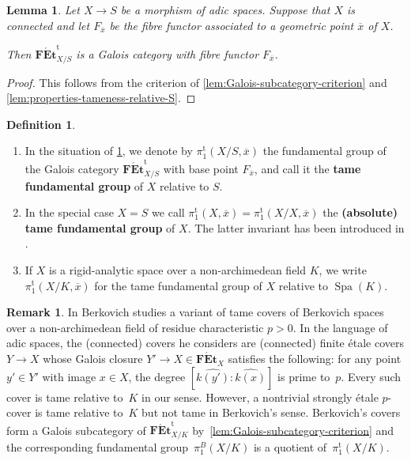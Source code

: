 \documentclass[a4paper,twoside,11pt,reqno]{amsart}
\DeclareMathOperator{\Spa}{Spa}
\newcommand{\cat}[1]{\mathbf{#1}}
\newcommand{\FEt}{\cat{F\acute{E}t}}
\newcommand{\ov}[1]{\overline{#1}}
\newcommand{\pitame}{\pi_1^{\mathrm{t}}}
\newcommand{\FEtt}{{\cat{F\acute{E}t}}^{\!\mathrm{t}}}
\newtheorem{lem}[thm]{Lemma}
\theoremstyle{definition}
\newtheorem{defi}[thm]{Definition}
\newtheorem{rmk}[thm]{Remark}
\numberwithin{equation}{subsection}
\begin{document}
\begin{lem} 
\label{lemma:adic-tame-galois}
    Let $X\to S$ be a morphism of adic spaces. Suppose that $X$ is connected and let $F_{\ov x}$ be the fibre functor associated to a geometric point  $\ov{x}$ of $X$. 

    Then $\FEtt_{X/S}$ is a Galois category with fibre functor $F_{\ov{x}}$. 
\end{lem}

\begin{proof}
This follows from the criterion of \cref{lem:Galois-subcategory-criterion} and \cref{lem:properties-tameness-relative-S}. 
\end{proof}

\begin{defi} \label{def:tamepi1-rigid}
\begin{enumerate}
    \item 
    In the situation of \cref{lemma:adic-tame-galois}, we denote by 
    $\pitame(X/S, \ov{x})$
    the fundamental group of the Galois category $\FEtt_{X/S}$ with base point $F_{\ov{x}}$, and call it the \textbf{tame fundamental group} of $X$ relative to $S$. 
    \item
    In the special case $X = S$ we call $\pitame(X, \ov{x}) = \pitame(X/X, \ov{x})$ the \textbf{(absolute) tame fundamental group} of $X$. The latter invariant has been introduced in \cite[\S9]{Hubner2021:AdicTameSite}.
    \item    
    If $X$ is a rigid-analytic space over a non-archimedean field $K$, we write $\pitame(X/K, \ov{x})$ for the tame fundamental group of $X$ relative to $\Spa(K)$. 
\end{enumerate}
\end{defi}

\begin{rmk} \label{rmk:Berkovich-covers}
    In \cite[\S6.3]{Berkovich:EtaleCohomology} Berkovich studies a variant of tame covers of Berkovich spaces over a non-archimedean field of residue characteristic $p > 0$.
    In the language of adic spaces, the (connected) covers he considers are (connected) finite étale covers $Y \to X$ whose Galois closure $Y' \to X \in \FEt_X$ satisfies the following: for any point $y' \in Y'$ with image $x \in X$, the degree $[\widehat{k(y')}:\widehat{k(x)}]$ is prime to~$p$.
    Every such cover is tame relative to~$K$ in our sense.
    However, a nontrivial strongly étale $p$-cover is tame relative to~$K$ but not tame in Berkovich's sense.
    Berkovich's covers form a Galois subcategory of $\FEtt_{X/K}$ by~\cref{lem:Galois-subcategory-criterion} and the corresponding fundamental group~$\pi_1^B(X/K)$ is a quotient of~$\pitame(X/K)$.
\end{rmk}
\end{document}
